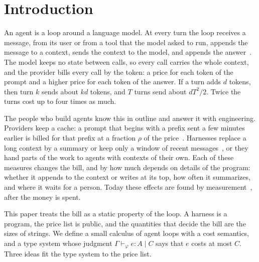 \documentclass[acmsmall,nonacm,screen]{acmart}
\begin{document}
\section{Introduction}

An agent is a loop around a language model. At every turn the loop receives a message, from its
user or from a tool that the model asked to run, appends the message to a context, sends the
context to the model, and appends the answer~\cite{yao2022}. The model keeps no state between
calls, so every call carries the whole context, and the provider bills every call by the token:
a price for each token of the prompt and a higher price for each token of the answer. If a turn
adds $d$ tokens, then turn $k$ sends about $kd$ tokens, and $T$ turns send about $dT^2/2$. Twice
the turns cost up to four times as much.

The people who build agents know this in outline and answer it with engineering. Providers keep
a cache: a prompt that begins with a prefix sent a few minutes earlier is billed for that
prefix at a fraction $\rho$ of the price~\cite{anthropic2026}. Harnesses replace a long context
by a summary or keep only a window of recent messages~\cite{packer2023}, or they hand parts
of the work to agents with contexts of their own. Each of these measures changes the bill, and by how
much depends on details of the program: whether it appends to the context or writes at its
top, how often it summarizes, and where it waits for a person. Today these effects are found by
measurement~\cite{lumer2026,xu2026}, after the money is spent.

This paper treats the bill as a static property of the loop. A harness is a program, the price
list is public, and the quantities that decide the bill are the sizes of strings. We define a
small calculus of agent loops with a cost semantics, and a type system whose judgment
$\Gamma \vdash_\varphi e : A \mid C$ says that $e$ costs at most $C$. Three ideas fit the type
system to the price list.
\end{document}

